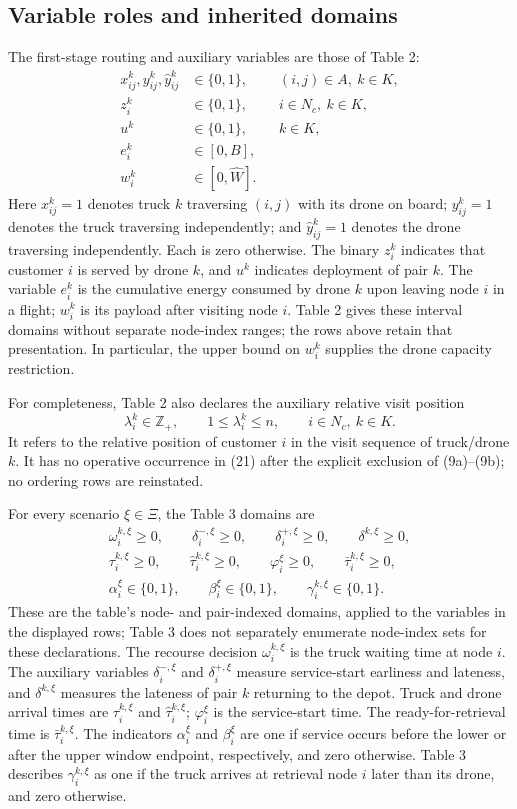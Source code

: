 \documentclass[10pt]{article}
\begin{document}
\subsection*{Variable roles and inherited domains}
The first-stage routing and auxiliary variables are those of Table 2:
\[
\begin{aligned}
x_{ij}^k,y_{ij}^k,\hat y_{ij}^k&\in\{0,1\},&& (i,j)\in A,\ k\in K,\\
z_i^k&\in\{0,1\},&& i\in N_c,\ k\in K,\\
u^k&\in\{0,1\},&& k\in K,\\
e_i^k&\in[0,B],\\
w_i^k&\in[0,\hat W].
\end{aligned}
\]
Here $x_{ij}^k=1$ denotes truck $k$ traversing $(i,j)$ with its drone on board; $y_{ij}^k=1$ denotes the truck traversing independently; and $\hat y_{ij}^k=1$ denotes the drone traversing independently. Each is zero otherwise. The binary $z_i^k$ indicates that customer $i$ is served by drone $k$, and $u^k$ indicates deployment of pair $k$. The variable $e_i^k$ is the cumulative energy consumed by drone $k$ upon leaving node $i$ in a flight; $w_i^k$ is its payload after visiting node $i$. Table 2 gives these interval domains without separate node-index ranges; the rows above retain that presentation. In particular, the upper bound on $w_i^k$ supplies the drone capacity restriction.

For completeness, Table 2 also declares the auxiliary relative visit position
\[
\lambda_i^k\in\mathbb Z_+,\qquad 1\leq\lambda_i^k\leq n,
\qquad i\in N_c,\ k\in K.
\]
It refers to the relative position of customer $i$ in the visit sequence of truck/drone $k$. It has no operative occurrence in (21) after the explicit exclusion of (9a)--(9b); no ordering rows are reinstated.

For every scenario $\xi\in\Xi$, the Table 3 domains are
\[
\begin{gathered}
\omega_i^{k,\xi}\geq0,\qquad
\delta_i^{-,\xi}\geq0,\qquad\delta_i^{+,\xi}\geq0,\qquad\delta^{k,\xi}\geq0,\\
\tau_i^{k,\xi}\geq0,\qquad\hat\tau_i^{k,\xi}\geq0,\qquad
\varphi_i^\xi\geq0,\qquad\bar\tau_i^{k,\xi}\geq0,\\
\alpha_i^\xi\in\{0,1\},\qquad\beta_i^\xi\in\{0,1\},\qquad
\gamma_i^{k,\xi}\in\{0,1\}.
\end{gathered}
\]
These are the table's node- and pair-indexed domains, applied to the variables in the displayed rows; Table 3 does not separately enumerate node-index sets for these declarations. The recourse decision $\omega_i^{k,\xi}$ is the truck waiting time at node $i$. The auxiliary variables $\delta_i^{-,\xi}$ and $\delta_i^{+,\xi}$ measure service-start earliness and lateness, and $\delta^{k,\xi}$ measures the lateness of pair $k$ returning to the depot. Truck and drone arrival times are $\tau_i^{k,\xi}$ and $\hat\tau_i^{k,\xi}$; $\varphi_i^\xi$ is the service-start time. The ready-for-retrieval time is $\bar\tau_i^{k,\xi}$. The indicators $\alpha_i^\xi$ and $\beta_i^\xi$ are one if service occurs before the lower or after the upper window endpoint, respectively, and zero otherwise. Table 3 describes $\gamma_i^{k,\xi}$ as one if the truck arrives at retrieval node $i$ later than its drone, and zero otherwise.
\end{document}

